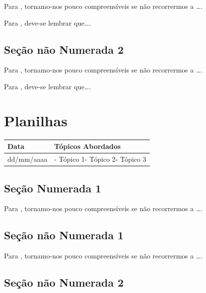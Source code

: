 \documentclass[
]{book}
\begin{document}
Para \citet{BOCK2001}, tornamo-nos pouco compreensíveis se não recorrermos a \ldots.

Para \citet{DAVIDOFF2001}, deve-se lembrar que\ldots.

\hypertarget{seuxe7uxe3o-nuxe3o-numerada-2-86}{%
\subsection*{Seção não Numerada 2}\label{seuxe7uxe3o-nuxe3o-numerada-2-86}}

Para \citet{BOCK2001}, tornamo-nos pouco compreensíveis se não recorrermos a \ldots.

Para \citet{DAVIDOFF2001}, deve-se lembrar que\ldots.

\hypertarget{planilhas-1}{%
\section{Planilhas}\label{planilhas-1}}

\begin{longtable}[]{@{}ll@{}}
\toprule()
Data & Tópicos Abordados \\
\midrule()
\endhead
dd/mm/aaaa & - Tópico 1- Tópico 2- Tópico 3 \\
\bottomrule()
\end{longtable}

\hypertarget{seuxe7uxe3o-numerada-1-29}{%
\subsection{Seção Numerada 1}\label{seuxe7uxe3o-numerada-1-29}}

Para \citet{BOCK2001}, tornamo-nos pouco compreensíveis se não recorrermos a \ldots.

\hypertarget{seuxe7uxe3o-nuxe3o-numerada-1-58}{%
\subsection*{Seção não Numerada 1}\label{seuxe7uxe3o-nuxe3o-numerada-1-58}}

Para \citet{BOCK2001}, tornamo-nos pouco compreensíveis se não recorrermos a \ldots.

\hypertarget{seuxe7uxe3o-nuxe3o-numerada-2-87}{%
\subsection*{Seção não Numerada 2}\label{seuxe7uxe3o-nuxe3o-numerada-2-87}}
\end{document}
